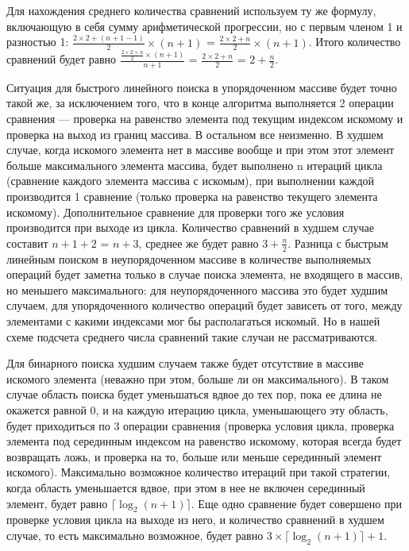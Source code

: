 \documentclass[12pt]{article}
\begin{document}
{	Для нахождения среднего количества сравнений используем ту же формулу, включающую в себя сумму арифметической прогрессии, но с первым членом 1 и разностью 1: $\frac{2\times2 + (n+1-1)}{2}\times(n+1)$ = $\frac{2\times2 + n}{2}\times(n+1)$. Итого количество сравнений будет равно $\frac{\frac{2\times2 + n}{2}\times(n+1)}{n+1}$ = $\frac{2\times2 + n}{2}$ = $2 + \frac{n}{2}$.
	
	Ситуация для быстрого линейного поиска в упорядоченном массиве будет точно такой же, за исключением того, что в конце алгоритма выполняется 2 операции сравнения --- проверка на равенство элемента под текущим индексом искомому и проверка на выход из границ массива. В остальном все неизменно. В худшем случае, когда искомого элемента нет в массиве вообще и при этом этот элемент больше максимального элемента массива, будет выполнено n итераций цикла (сравнение каждого элемента массива с искомым), при выполнении каждой производится 1 сравнение (только проверка на равенство текущего элемента искомому). Дополнительное сравнение для проверки того же условия производится при выходе из цикла. Количество сравнений в худшем случае составит $n+1 + 2$ = $n + 3$, среднее же будет равно $3 + \frac{n}{2}$. Разница с быстрым линейным поиском в неупорядоченном массиве в количестве выполняемых операций будет заметна только в случае поиска элемента, не входящего в массив, но меньшего максимального: для неупорядоченного массива это будет худшим случаем, для упорядоченного количество операций будет зависеть от того, между элементами с какими индексами мог бы располагаться искомый. Но в нашей схеме подсчета среднего числа сравнений такие случаи не рассматриваются.
	
	Для бинарного поиска худшим случаем также будет отсутствие в массиве искомого элемента (неважно при этом, больше ли он максимального). В таком случае область поиска будет уменьшаться вдвое до тех пор, пока ее длина не окажется равной 0, и на каждую итерацию цикла, уменьшающего эту область, будет приходиться по 3 операции сравнения (проверка условия цикла, проверка элемента под серединным индексом на равенство искомому, которая всегда будет возвращать ложь, и проверка на то, больше или меньше серединный элемент искомого). Максимально возможное количество итераций при такой стратегии, когда область уменьшается вдвое, при этом в нее не включен серединный элемент, будет равно $\lceil \log_2{(n+1)}\rceil$. Еще одно сравнение будет совершено при проверке условия цикла на выходе из него, и количество сравнений в худшем случае, то есть максимально возможное, будет равно $3\times\lceil \log_2{(n+1)}\rceil + 1$.

}
\end{document}
